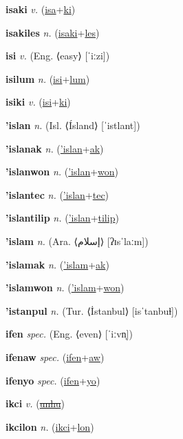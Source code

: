 \textbf{\hypertarget{isaki}{isaki}} \textit{v.} (\hyperlink{isa}{isa}+\allowbreak \hyperlink{ki}{ki})


\textbf{\hypertarget{isakiles}{isakiles}} \textit{n.} (\hyperlink{isaki}{isaki}+\allowbreak \hyperlink{les}{les})


\textbf{\hypertarget{isi}{isi}} \textit{v.} (Eng. ⟨easy⟩ [ˈiːzi])


\textbf{\hypertarget{isilum}{isilum}} \textit{n.} (\hyperlink{isi}{isi}+\allowbreak \hyperlink{lum}{lum})


\textbf{\hypertarget{isiki}{isiki}} \textit{v.} (\hyperlink{isi}{isi}+\allowbreak \hyperlink{ki}{ki})


\textbf{\hypertarget{'islan}{'islan}} \textit{n.} (Isl. ⟨Ísland⟩ [ˈistlant])


\textbf{\hypertarget{'islanak}{'islanak}} \textit{n.} (\hyperlink{'islan}{'islan}+\allowbreak \hyperlink{ak}{ak})


\textbf{\hypertarget{'islanwon}{'islanwon}} \textit{n.} (\hyperlink{'islan}{'islan}+\allowbreak \hyperlink{won}{won})


\textbf{\hypertarget{'islantec}{'islantec}} \textit{n.} (\hyperlink{'islan}{'islan}+\allowbreak \hyperlink{tec}{tec})


\textbf{\hypertarget{'islantilip}{'islantilip}} \textit{n.} (\hyperlink{'islan}{'islan}+\allowbreak \hyperlink{tilip}{tilip})


\textbf{\hypertarget{'islam}{'islam}} \textit{n.} (Ara. ⟨{\arabics{}إسلام}⟩ [ʔɪsˈlaːm])


\textbf{\hypertarget{'islamak}{'islamak}} \textit{n.} (\hyperlink{'islam}{'islam}+\allowbreak \hyperlink{ak}{ak})


\textbf{\hypertarget{'islamwon}{'islamwon}} \textit{n.} (\hyperlink{'islam}{'islam}+\allowbreak \hyperlink{won}{won})


\textbf{\hypertarget{'istanpul}{'istanpul}} \textit{n.} (Tur. ⟨İstanbul⟩ [isˈtanbuɫ])


\textbf{\hypertarget{ifen}{ifen}} \textit{spec.} (Eng. ⟨even⟩ [ˈiːvn̩])


\textbf{\hypertarget{ifenaw}{ifenaw}} \textit{spec.} (\hyperlink{ifen}{ifen}+\allowbreak \hyperlink{aw}{aw})


\textbf{\hypertarget{ifenyo}{ifenyo}} \textit{spec.} (\hyperlink{ifen}{ifen}+\allowbreak \hyperlink{yo}{yo})


\textbf{\hypertarget{ikci}{ikci}} \textit{v.} (\hyperlink{unhu}{\sout{unhu}})


\textbf{\hypertarget{ikcilon}{ikcilon}} \textit{n.} (\hyperlink{ikci}{ikci}+\allowbreak \hyperlink{lon}{lon})


